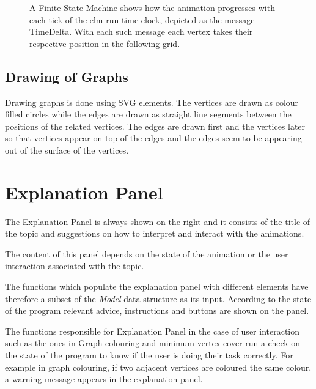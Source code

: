 \begin{figure}[ht] %
\centering %
\caption{ A Finite State Machine shows how the animation progresses with
          each tick of the elm run-time clock, depicted as the message TimeDelta.
          With each such message each vertex takes their
          respective position in the following grid.
        }
\label{fig: animationFSM}
\end{figure}
\subsection{Drawing of Graphs}
Drawing graphs is done using SVG elements. The vertices are drawn as colour
filled circles while the edges are drawn as straight line segments between the
positions of the related vertices. The edges are drawn first and the vertices
later so that vertices appear on top of the edges and the edges seem to be
appearing out of the surface of the vertices.

\section{Explanation Panel}

The Explanation Panel is always shown on the right and it consists of the title of the topic and suggestions on how
to interpret and interact with the animations.

The content of this panel depends on the state of the animation or the user
interaction associated with the topic.

The functions which populate the explanation panel with different elements have
therefore a subset of the \emph{Model} data structure as its input.  According
to the state of the program relevant advice, instructions and buttons are
shown on the panel.

The functions responsible for Explanation Panel in the case of user interaction
such as the ones in Graph colouring and minimum vertex cover run a check on the
state of the program to know if the user is doing their task correctly. For
example in graph colouring, if two adjacent vertices are coloured the same colour,
a warning message appears in the explanation panel.



